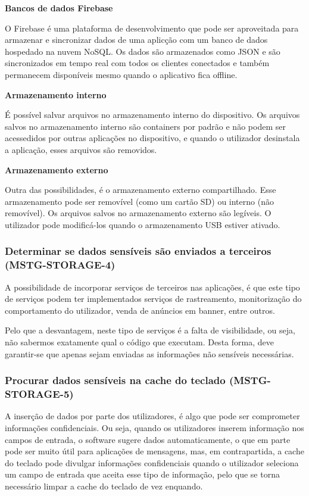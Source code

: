 \textbf{Bancos de dados Firebase}
\par O Firebase é uma plataforma de desenvolvimento que pode ser aproveitada para armazenar e sincronizar dados de uma aplicção com um banco de dados hospedado na nuvem NoSQL. Os dados são armazenados como JSON e são sincronizados em tempo real com todos os clientes conectados e também permanecem disponíveis mesmo quando o aplicativo fica offline.
\\
\par \textbf{Armazenamento interno}
\par É possível salvar arquivos no armazenamento interno do dispositivo. Os arquivos salvos no armazenamento interno são containers por padrão e não podem ser acessedidos por outras aplicações no dispositivo, e quando o utilizador desinstala a aplicação, esses arquivos são removidos.
\\
\par \textbf{Armazenamento externo}
\par Outra das possibilidades, é o armazenamento externo compartilhado. Esse armazenamento pode ser removível (como um cartão SD) ou interno (não removível). Os arquivos salvos no armazenamento externo são legíveis. O utilizador pode modificá-los quando o armazenamento USB estiver ativado.



\subsubsection{Determinar se dados sensíveis são enviados a terceiros (MSTG-STORAGE-4)}
\par A possibilidade de incorporar serviços de terceiros nas aplicações, é que este tipo de serviços podem ter implementados serviços de rastreamento, monitorização do comportamento do utilizador, venda de anúncios em banner, entre outros.
\par Pelo que a desvantagem, neste tipo de serviços é a falta de visibilidade, ou seja, não sabermos exatamente qual o código que executam. Desta forma, deve garantir-se que apenas sejam enviadas as informações não sensíveis necessárias.


\subsubsection{Procurar dados sensíveis na cache do teclado (MSTG-STORAGE-5)}
\par A inserção de dados por parte dos utilizadores, é algo que pode ser comprometer informações confidenciais. Ou seja, quando os utilizadores inserem informação nos campos de entrada, o software sugere dados automaticamente, o que em parte pode ser muito útil para aplicações de mensagens, mas, em contrapartida, a cache do teclado pode divulgar informações confidenciais quando o utilizador seleciona um campo de entrada que aceita esse tipo de informação, pelo que se torna necessário limpar a cache do teclado de vez enquando.



